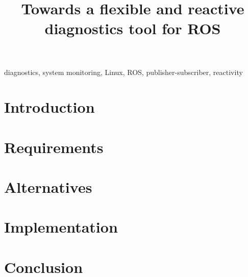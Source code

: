 \documentclass[conference]{IEEEtran}
\begin{document}
\title{Towards a flexible and reactive diagnostics tool for ROS}

\author{
}

\maketitle

\begin{abstract}

\end{abstract}

\begin{IEEEkeywords}
diagnostics, system monitoring, Linux, ROS, publisher-subscriber, reactivity
\end{IEEEkeywords}

\IEEEpeerreviewmaketitle

\section{Introduction} \label{section:introduction}


\section{Requirements} \label{section:requirements}


\section{Alternatives} \label{section:alternatives}


\section{Implementation} \label{section:implementation}


\section{Conclusion} \label{section:conclusion}


\ifCLASSOPTIONcaptionsoff
  \newpage
\fi



\end{document}
